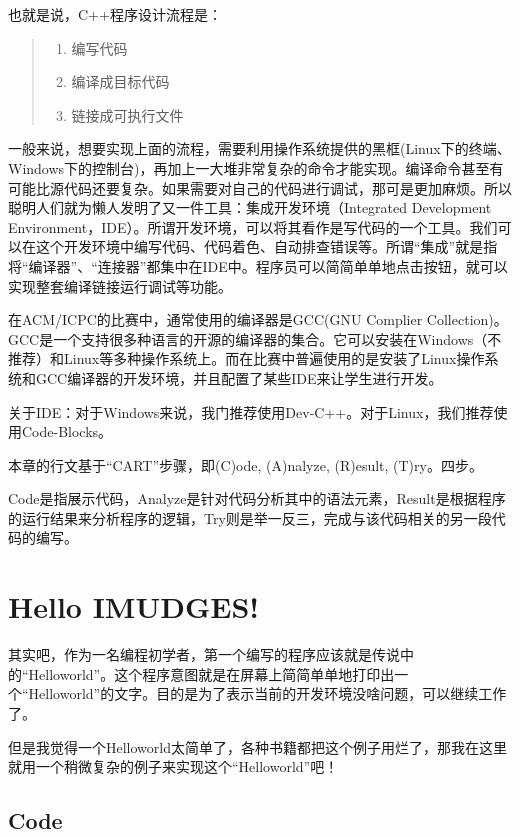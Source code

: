 也就是说，C++程序设计流程是：
\begin{quote}
	\begin{enumerate}
		\item 编写代码
		\item 编译成目标代码
		\item 链接成可执行文件
	\end{enumerate}
\end{quote}


一般来说，想要实现上面的流程，需要利用操作系统提供的黑框(Linux下的终端、Windows下的控制台)，再加上一大堆非常复杂的命令才能实现。编译命令甚至有可能比源代码还要复杂。如果需要对自己的代码进行调试，那可是更加麻烦。所以聪明人们就为懒人发明了又一件工具：集成开发环境（Integrated Development Environment，IDE）。所谓开发环境，可以将其看作是写代码的一个工具。我们可以在这个开发环境中编写代码、代码着色、自动排查错误等。所谓“集成”就是指将“编译器”、“连接器”都集中在IDE中。程序员可以简简单单地点击按钮，就可以实现整套编译链接运行调试等功能。

在ACM/ICPC的比赛中，通常使用的编译器是GCC(GNU Complier Collection)。GCC是一个支持很多种语言的开源的编译器的集合。它可以安装在Windows（不推荐）和Linux等多种操作系统上。而在比赛中普遍使用的是安装了Linux操作系统和GCC编译器的开发环境，并且配置了某些IDE来让学生进行开发。

关于IDE：对于Windows来说，我门推荐使用Dev-C++。对于Linux，我们推荐使用Code-Blocks。

本章的行文基于“CART”步骤，即(C)ode, (A)nalyze, (R)esult, (T)ry。四步。

Code是指展示代码，Analyze是针对代码分析其中的语法元素，Result是根据程序的运行结果来分析程序的逻辑，Try则是举一反三，完成与该代码相关的另一段代码的编写。

\section{Hello IMUDGES!}
其实吧，作为一名编程初学者，第一个编写的程序应该就是传说中的“Helloworld”。这个程序意图就是在屏幕上简简单单地打印出一个“Helloworld”的文字。目的是为了表示当前的开发环境没啥问题，可以继续工作了。

但是我觉得一个Helloworld太简单了，各种书籍都把这个例子用烂了，那我在这里就用一个稍微复杂的例子来实现这个“Helloworld”吧！

\subsection{Code}


